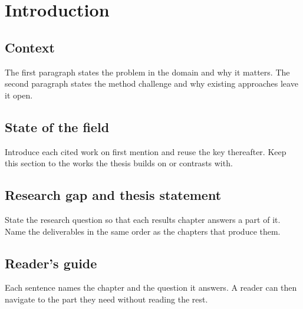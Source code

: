 \chapter{Introduction}
\label{ch:introduction}


\section{Context}
\label{sec:ch1-context}

 The first paragraph
states the problem in the domain and why it matters. The second paragraph states the
method challenge and why existing approaches leave it open.

\section{State of the field}
\label{sec:ch1-field}

 Introduce each cited work on first mention and
reuse the key thereafter. Keep this section to the works the thesis builds on or
contrasts with.

\section{Research gap and thesis statement}
\label{sec:ch1-gap}

State the research question so that each results chapter answers a part of it. Name the
deliverables in the same order as the chapters that produce them.

\section{Reader's guide}
\label{sec:ch1-guide}

 Each sentence names the chapter and the question it
answers. A reader can then navigate to the part they need without reading the rest.
